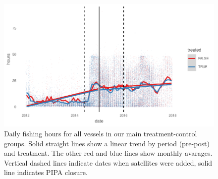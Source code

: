\documentclass[11pt,english]{article}
\begin{document}
\begin{figure}
\centering
\includegraphics{Manuscript_files/figure-latex/unnamed-chunk-10-1.pdf}
\caption{\label{fig:unnamed-chunk-10}\label{fig:all_vessels}Daily fishing
hours for all vessels in our main treatment-control groups. Solid
straight lines show a linear trend by period (pre-post) and treatment.
The other red and blue lines show monthly avarages. Vertical dashed
lines indicate dates when satellites were added, solid line indicates
PIPA closure.}
\end{figure}
\end{document}
